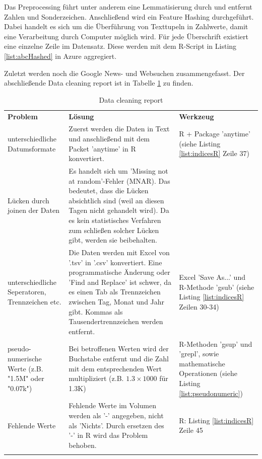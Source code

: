 
Das Preprocessing führt unter anderem eine Lemmatisierung durch und entfernt Zahlen und Sonderzeichen. Anschließend wird ein Feature Hashing durchgeführt. Dabei handelt es sich um die Überführung von Texttupeln in Zahlwerte, damit eine Verarbeitung durch Computer möglich wird. Für jede Überschrift existiert eine einzelne Zeile im Datensatz. Diese werden mit dem R-Script in Listing \ref{list:abcHashed} in Azure aggregiert.

Zuletzt werden noch die Google News- und Websuchen zusammengefasst. Der abschließende Data cleaning report ist in Tabelle \ref{tab:selecData} zu finden.
\begin{centering} \begin{longtable}[H]{|p{4cm}|p{8cm}|p{4cm}|}
\hline
\textbf{Problem} & \textbf{Lösung} & \textbf{Werkzeug} \\
\hhline{===} 
unterschiedliche Datumsformate & Zuerst werden die Daten in Text und anschließend mit dem Packet 'anytime' in R konvertiert. & R + Package 'anytime' (siehe Listing \ref{list:indicesR} Zeile 37) \\ \hline
Lücken durch joinen der Daten & Es handelt sich um 'Missing not at random'-Fehler (MNAR)\citep[S.~553]{graham_missing_2009}. Das bedeutet, dass die Lücken absichtlich sind (weil an diesen Tagen nicht gehandelt wird). Da es kein statistisches Verfahren zum schließen solcher Lücken gibt, werden sie beibehalten. \citep[S.~1109]{leonhart_dorsch_2014} & \\ \hline
unterschiedliche Seperatoren, Trennzeichen etc. & Die Daten werden mit Excel von '.tsv' in '.csv' konvertiert. Eine programmatische Änderung oder 'Find and Replace' ist schwer, da es einen Tab als Trennzeichen zwischen Tag, Monat und Jahr gibt. Kommas als Tausendertrennzeichen werden entfernt. & Excel 'Save As...' und R-Methode 'gsub' (siehe Listing \ref{list:indicesR} Zeilen 30-34) \\ \hline
pseudo-numerische Werte (z.B. "1.5M" oder "0.07k") & Bei betroffenen Werten wird der Buchstabe entfernt und die Zahl mit dem entsprechenden Wert multipliziert (z.B. $ 1.3 \times 1000 $ für 1.3K) & R-Methoden 'gsup' und 'grepl', sowie mathematische Operationen (siehe Listing \ref{list:pseudonumeric})\\ \hline
Fehlende Werte & Fehlende Werte im Volumen werden als '-' angegeben, nicht als 'Nichts'. Durch ersetzen des '-' in R wird das Problem behoben. & R: Listing \ref{list:indicesR} Zeile 45 \\ \hline
\caption{Data cleaning report}
\label{tab:selecData}
\end{longtable} \end{centering}
